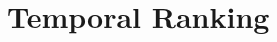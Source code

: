 \documentclass[letterpaper,12pt,titlepage,oneside,final]{book}
\begin{document}






\section{Temporal Ranking}
\label{sec:rank}
\end{document}
